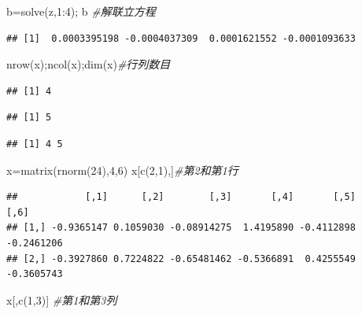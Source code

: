 \documentclass[
]{book}
\newenvironment{Shaded}{\begin{snugshade}}{\end{snugshade}}
\newcommand{\CommentTok}[1]{\textcolor[rgb]{0.56,0.35,0.01}{\textit{#1}}}
\newcommand{\DecValTok}[1]{\textcolor[rgb]{0.00,0.00,0.81}{#1}}
\newcommand{\FunctionTok}[1]{\textcolor[rgb]{0.00,0.00,0.00}{#1}}
\newcommand{\NormalTok}[1]{#1}
\newcommand{\OtherTok}[1]{\textcolor[rgb]{0.56,0.35,0.01}{#1}}
\newcommand{\SpecialCharTok}[1]{\textcolor[rgb]{0.00,0.00,0.00}{#1}}
\begin{document}
\begin{Shaded}
\begin{Highlighting}[]
\NormalTok{b}\OtherTok{=}\FunctionTok{solve}\NormalTok{(z,}\DecValTok{1}\SpecialCharTok{:}\DecValTok{4}\NormalTok{); b }\CommentTok{\#解联立方程}
\end{Highlighting}
\end{Shaded}

\begin{verbatim}
## [1]  0.0003395198 -0.0004037309  0.0001621552 -0.0001093633
\end{verbatim}

\begin{Shaded}
\begin{Highlighting}[]
\FunctionTok{nrow}\NormalTok{(x);}\FunctionTok{ncol}\NormalTok{(x);}\FunctionTok{dim}\NormalTok{(x)}\CommentTok{\#行列数目}
\end{Highlighting}
\end{Shaded}

\begin{verbatim}
## [1] 4
\end{verbatim}

\begin{verbatim}
## [1] 5
\end{verbatim}

\begin{verbatim}
## [1] 4 5
\end{verbatim}

\begin{Shaded}
\begin{Highlighting}[]
\NormalTok{x}\OtherTok{=}\FunctionTok{matrix}\NormalTok{(}\FunctionTok{rnorm}\NormalTok{(}\DecValTok{24}\NormalTok{),}\DecValTok{4}\NormalTok{,}\DecValTok{6}\NormalTok{)}
\NormalTok{x[}\FunctionTok{c}\NormalTok{(}\DecValTok{2}\NormalTok{,}\DecValTok{1}\NormalTok{),]}\CommentTok{\#第2和第1行}
\end{Highlighting}
\end{Shaded}

\begin{verbatim}
##            [,1]      [,2]        [,3]       [,4]       [,5]       [,6]
## [1,] -0.9365147 0.1059030 -0.08914275  1.4195890 -0.4112898 -0.2461206
## [2,] -0.3927860 0.7224822 -0.65481462 -0.5366891  0.4255549 -0.3605743
\end{verbatim}

\begin{Shaded}
\begin{Highlighting}[]
\NormalTok{x[,}\FunctionTok{c}\NormalTok{(}\DecValTok{1}\NormalTok{,}\DecValTok{3}\NormalTok{)] }\CommentTok{\#第1和第3列}
\end{Highlighting}
\end{Shaded}
\end{document}
